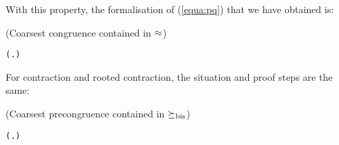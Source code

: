 With this property, the formalisation of (\ref{equa:pq}) that we have
obtained is:
\begin{theorem}{(Coarsest congruence contained in $\approx$)}
\begin{alltt}
\HOLTokenTurnstile{}   \HOLSymConst{\HOLTokenConj{}}   \HOLSymConst{\HOLTokenImp{}} (\HOLSymConst{\HOLTokenForall{}}.  \HOLSymConst{+}  \HOLSymConst{\HOLTokenWeakEQ}  \HOLSymConst{+} ) \HOLSymConst{\HOLTokenImp{}}  \HOLSymConst{\HOLTokenObsCongr} 
\end{alltt}
\end{theorem}

For contraction and rooted contraction, the situation and proof
steps are the same:
\begin{theorem}{(Coarsest precongruence contained in $\mathrel{\succeq_{\rm{bis}}}$)}
\begin{alltt}
\HOLTokenTurnstile{}   \HOLSymConst{\HOLTokenConj{}}   \HOLSymConst{\HOLTokenImp{}} (\HOLSymConst{\HOLTokenForall{}}.  \HOLSymConst{+}  \HOLSymConst{\HOLTokenContracts{}}  \HOLSymConst{+} ) \HOLSymConst{\HOLTokenImp{}}  \HOLSymConst{\HOLTokenObsContracts} 
\end{alltt}
\end{theorem}
